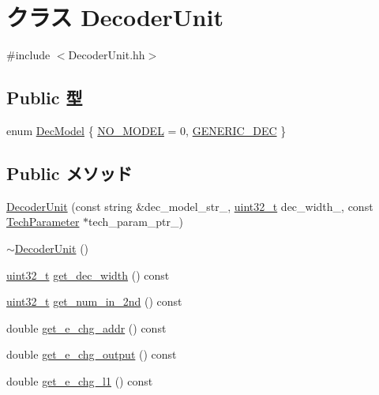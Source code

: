 \hypertarget{classDecoderUnit}{
\section{クラス DecoderUnit}
\label{classDecoderUnit}
}


{\ttfamily \#include $<$DecoderUnit.hh$>$}\subsection*{Public 型}
\begin{DoxyCompactItemize}
\item 
enum \hyperlink{classDecoderUnit_a3dfab203c31b5869c76011da4dfea555}{DecModel} \{ \hyperlink{classDecoderUnit_a3dfab203c31b5869c76011da4dfea555abab57b6e2c553e4d983f415a1f4ea75b}{NO\_\-MODEL} =  0, 
\hyperlink{classDecoderUnit_a3dfab203c31b5869c76011da4dfea555a09523c5db72a4b210833a2830b2805d8}{GENERIC\_\-DEC}
 \}
\end{DoxyCompactItemize}
\subsection*{Public メソッド}
\begin{DoxyCompactItemize}
\item 
\hyperlink{classDecoderUnit_abacb41b8d8b2df0e3dd7aa011dd24a68}{DecoderUnit} (const string \&dec\_\-model\_\-str\_\-, \hyperlink{Type_8hh_a435d1572bf3f880d55459d9805097f62}{uint32\_\-t} dec\_\-width\_\-, const \hyperlink{classTechParameter}{TechParameter} $\ast$tech\_\-param\_\-ptr\_\-)
\item 
\hyperlink{classDecoderUnit_a1e5ebc6c8b7ab089ce33839a9f5601fe}{$\sim$DecoderUnit} ()
\item 
\hyperlink{Type_8hh_a435d1572bf3f880d55459d9805097f62}{uint32\_\-t} \hyperlink{classDecoderUnit_aac707404dfc7779123fb730a2f6141c9}{get\_\-dec\_\-width} () const 
\item 
\hyperlink{Type_8hh_a435d1572bf3f880d55459d9805097f62}{uint32\_\-t} \hyperlink{classDecoderUnit_aa1c4a00a38105789203640224c17ab51}{get\_\-num\_\-in\_\-2nd} () const 
\item 
double \hyperlink{classDecoderUnit_aafcd942be3eb33ab99af36e5401fd570}{get\_\-e\_\-chg\_\-addr} () const 
\item 
double \hyperlink{classDecoderUnit_a9ca52057e543e52513d98567c4af50d9}{get\_\-e\_\-chg\_\-output} () const 
\item 
double \hyperlink{classDecoderUnit_ad527ffaaaf60aba8b3951e856b340629}{get\_\-e\_\-chg\_\-l1} () const 
\end{DoxyCompactItemize}
